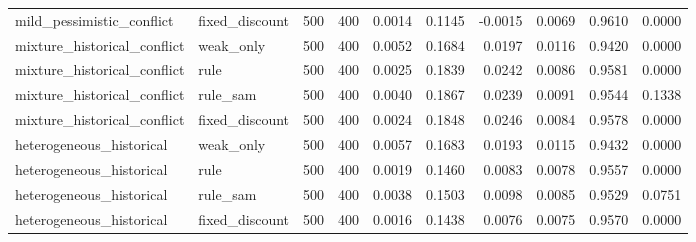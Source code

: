 \begin{table}[htbp]
\begin{tabular}{llrrrrrrrr}
mild\_pessimistic\_conflict & fixed\_discount & 500 & 400 & 0.0014 & 0.1145 & -0.0015 & 0.0069 & 0.9610 & 0.0000 \\
mixture\_historical\_conflict & weak\_only & 500 & 400 & 0.0052 & 0.1684 & 0.0197 & 0.0116 & 0.9420 & 0.0000 \\
mixture\_historical\_conflict & rule & 500 & 400 & 0.0025 & 0.1839 & 0.0242 & 0.0086 & 0.9581 & 0.0000 \\
mixture\_historical\_conflict & rule\_sam & 500 & 400 & 0.0040 & 0.1867 & 0.0239 & 0.0091 & 0.9544 & 0.1338 \\
mixture\_historical\_conflict & fixed\_discount & 500 & 400 & 0.0024 & 0.1848 & 0.0246 & 0.0084 & 0.9578 & 0.0000 \\
heterogeneous\_historical & weak\_only & 500 & 400 & 0.0057 & 0.1683 & 0.0193 & 0.0115 & 0.9432 & 0.0000 \\
heterogeneous\_historical & rule & 500 & 400 & 0.0019 & 0.1460 & 0.0083 & 0.0078 & 0.9557 & 0.0000 \\
heterogeneous\_historical & rule\_sam & 500 & 400 & 0.0038 & 0.1503 & 0.0098 & 0.0085 & 0.9529 & 0.0751 \\
heterogeneous\_historical & fixed\_discount & 500 & 400 & 0.0016 & 0.1438 & 0.0076 & 0.0075 & 0.9570 & 0.0000 \\
\bottomrule
\end{tabular}
\end{table}
